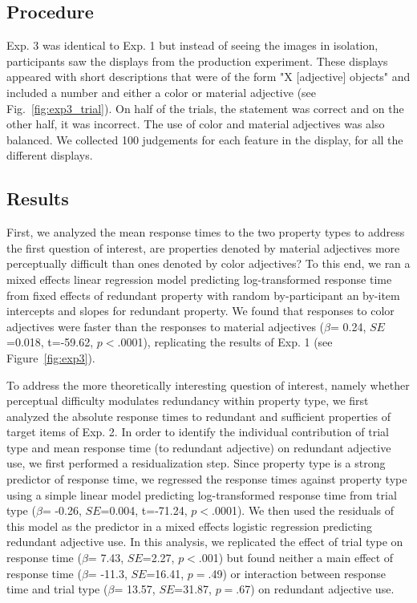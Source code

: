 \documentclass[12pt,letterpaper]{article}
\begin{document}
\subsection{Procedure} 

Exp. 3 was identical to Exp. 1 but instead of seeing the images in isolation, participants saw the displays from the production experiment. These displays appeared with short descriptions that were of the form "X [adjective] objects" and included a number and either a color or material adjective (see Fig.~\ref{fig:exp3_trial}). On half of the trials, the statement was correct and on the other half, it was incorrect. The use of color and material adjectives was also balanced. We collected 100 judgements for each feature in the display, for all the different displays.

\subsection{Results} 

First, we analyzed the mean response times to the two property types to address the first question of interest, are properties denoted by material adjectives more perceptually difficult than ones denoted by color adjectives? To this end, we ran a mixed effects linear regression model predicting log-transformed response time from fixed effects of redundant property with random by-participant an by-item intercepts and slopes for redundant property. We found that responses to color adjectives were faster than the responses to material adjectives ($\beta$= 0.24, $SE$=0.018, t=-59.62, $p$$<$.0001), replicating the results of Exp. 1 (see Figure~\ref{fig:exp3}). 

To address the more theoretically interesting question of interest, namely whether perceptual difficulty modulates redundancy within property type, we first analyzed the absolute response times to redundant and sufficient properties of target items of Exp. 2. In order to identify the individual contribution of trial type and mean response time (to redundant adjective) on redundant adjective use, we first performed a residualization step. Since property type is a strong predictor of response time, we regressed the response times against property type using a simple linear model predicting log-transformed response time from trial type ($\beta$= -0.26, $SE$=0.004, t=-71.24, $p$$<$.0001). We then used the residuals of this model as the predictor in a mixed effects logistic regression predicting redundant adjective use. In this analysis, we replicated the effect of trial type on response time ($\beta$= 7.43, $SE$=2.27, $p$$<$.001) but found neither a main effect of response time ($\beta$= -11.3, $SE$=16.41, $p$$=$.49) or interaction between response time and trial type ($\beta$= 13.57, $SE$=31.87, $p$$=$.67) on redundant adjective use. 
\end{document}
